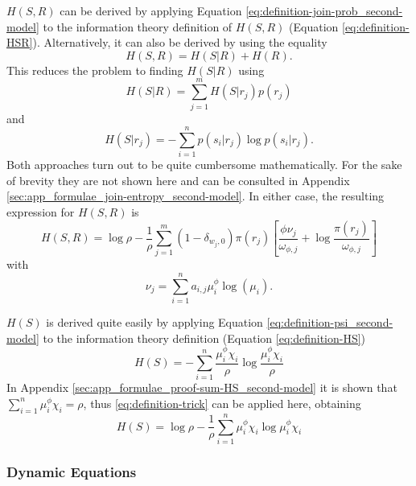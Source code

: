 $H(S,R)$ can be derived by applying Equation \eqref{eq:definition-join-prob_second-model} to the information theory definition of $H(S,R)$ (Equation \eqref{eq:definition-HSR}).
Alternatively, it can also be derived by using the equality
\begin{equation*}
  H(S,R) = H(S|R) + H(R).
\end{equation*}
This reduces the problem to finding $H(S|R)$ using
\begin{equation*}
  H(S|R) = \sum_{j=1}^m H(S|r_j)p(r_j) 
\end{equation*}
and
\begin{equation*}
  H(S|r_j) = -\sum_{i=1}^n p(s_i|r_j) \log p(s_i|r_j).
\end{equation*}
Both approaches turn out to be quite cumbersome mathematically.
For the sake of brevity they are not shown here and can be consulted in Appendix \ref{sec:app_formulae_join-entropy_second-model}.
In either case, the resulting expression for $H(S,R)$ is
\begin{equation}
  \label{eq:definition-HSR_second-model}
  H(S,R) = \log \rho - \frac{1}{\rho} \sum_{j=1}^m (1 - \delta_{w_j,0}) \pi(r_j) \left[ \frac{\phi \nu_j}{\omega_{\phi,j}} + \log \frac{\pi(r_j)}{\omega_{\phi,j}} \right]
\end{equation}
with
\begin{equation}
  \label{eq:definition-nu}
  \nu_j = \sum_{i=1}^n a_{i,j} \mu_i^\phi \log(\mu_i).
\end{equation}

$H(S)$ is derived quite easily by applying Equation \eqref{eq:definition-psi_second-model} to the information theory definition (Equation \eqref{eq:definition-HS})
\begin{equation*}
  H(S) = -\sum_{i=1}^n \frac{\mu_i^\phi \chi_i}{\rho} \log \frac{\mu_i^\phi \chi_i}{\rho}
\end{equation*}
In Appendix \ref{sec:app_formulae_proof-sum-HS_second-model} it is shown that $\sum_{i=1}^n \mu_i^\phi \chi_i = \rho$, thus \eqref{eq:definition-trick} can be applied here, obtaining
\begin{equation}
  \label{eq:definition-HS_second-model}
  H(S) = \log \rho - \frac{1}{\rho} \sum_{i=1}^n \mu_i^\phi \chi_i \log \mu_i^\phi \chi_i
\end{equation}

\subsubsection{Dynamic Equations}

